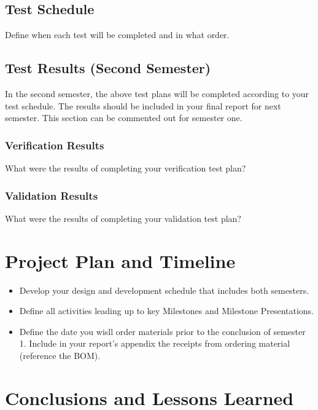 \documentclass{other/docTemplate}
\begin{document}
\subsection{Test Schedule}
Define when each test will be completed and in what order.


\subsection{Test Results (Second Semester)}
In the second semester, the above test plans will be completed according to your test schedule. The results should be included in your final report for next semester. This section can be commented out for semester one. 
\subsubsection{Verification Results}
What were the results of completing your verification test plan?

\subsubsection{Validation Results}
What were the results of completing your validation test plan?



\clearpage
\section{Project Plan and Timeline}
\begin{itemize}
\item Develop your design and development schedule that includes both semesters. 
\item Define all activities leading up to key Milestones and Milestone Presentations.
\item Define the date you wisll order materials prior to the conclusion of semester 1. 
Include in your report’s appendix the receipts from ordering material (reference the BOM). 
\end{itemize}

        
\clearpage
\section*{Conclusions and Lessons Learned}
\end{document}
